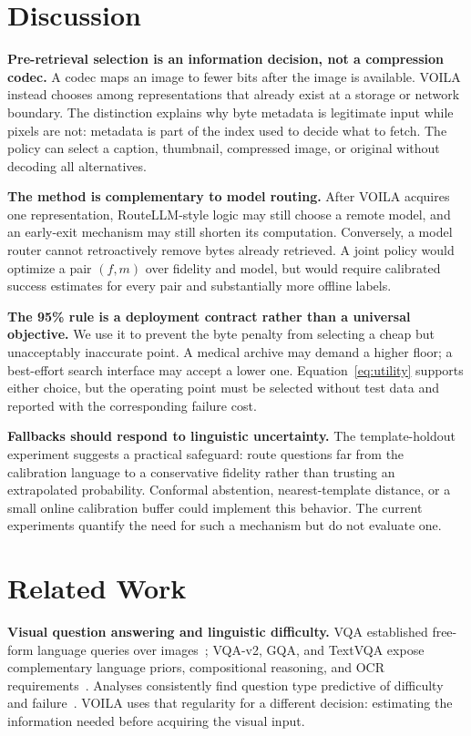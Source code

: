 \documentclass[10pt,conference]{IEEEtran}
\newcommand{\system}{\textsc{VOILA}\xspace}
\begin{document}
\section{Discussion}
\label{sec:discussion}

\textbf{Pre-retrieval selection is an information decision, not a compression
codec.} A codec maps an image to fewer bits after the image is available.
\system instead chooses among representations that already exist at a storage
or network boundary. The distinction explains why byte metadata is legitimate
input while pixels are not: metadata is part of the index used to decide what
to fetch. The policy can select a caption, thumbnail, compressed image, or
original without decoding all alternatives.

\textbf{The method is complementary to model routing.} After \system acquires
one representation, RouteLLM-style logic may still choose a remote model, and
an early-exit mechanism may still shorten its computation. Conversely, a model
router cannot retroactively remove bytes already retrieved. A joint policy
would optimize a pair $(f,m)$ over fidelity and model, but would require
calibrated success estimates for every pair and substantially more offline
labels.

\textbf{The 95\% rule is a deployment contract rather than a universal
objective.} We use it to prevent the byte penalty from selecting a cheap but
unacceptably inaccurate point. A medical archive may demand a higher floor; a
best-effort search interface may accept a lower one. Equation~\ref{eq:utility}
supports either choice, but the operating point must be selected without test
data and reported with the corresponding failure cost.

\textbf{Fallbacks should respond to linguistic uncertainty.} The
template-holdout experiment suggests a practical safeguard: route questions
far from the calibration language to a conservative fidelity rather than
trusting an extrapolated probability. Conformal abstention, nearest-template
distance, or a small online calibration buffer could implement this behavior.
The current experiments quantify the need for such a mechanism but do not
evaluate one.

\section{Related Work}
\label{sec:related}

\textbf{Visual question answering and linguistic difficulty.}
VQA established free-form language queries over images~\cite{antol2015vqa};
VQA-v2, GQA, and TextVQA expose complementary language priors, compositional
reasoning, and OCR requirements~\cite{goyal2017vqav2,hudson2019gqa,
singh2019textvqa}. Analyses consistently find question type predictive of
difficulty and failure~\cite{kafle2017analysis,agrawal2018dont}. \system uses
that regularity for a different decision: estimating the information needed
before acquiring the visual input.
\end{document}
